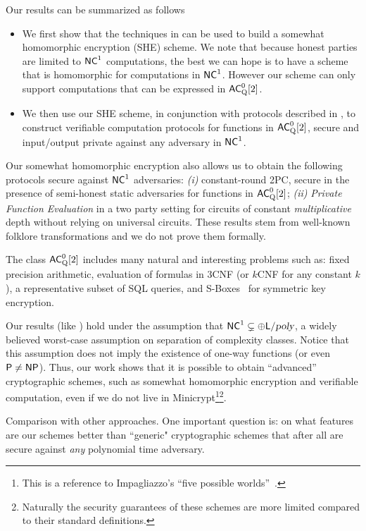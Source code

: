 Our results can be summarized as follows
\begin{itemize}
\item We first show that the techniques in \cite{fgcrypto} can be used to build a somewhat homomorphic encryption (SHE) scheme. 
We note that because honest parties are limited to 
${\mathsf{NC}}^1$ computations, the best we can hope is to have a scheme that is homomorphic for computations in ${\mathsf{NC}}^1$. However our scheme can only support computations that can be expressed in 
${\mathsf{AC}}^0_{\text{Q}}[2]$. 

\item We then use our SHE scheme, in conjunction with protocols described in \cite{ggp10,ckv10,aik10}, to construct verifiable 
computation protocols for functions in ${\mathsf{AC}}^0_{\text{Q}}[2]$, secure and input/output private against any adversary in ${\mathsf{NC}}^1$.

\end{itemize}
Our somewhat homomorphic encryption also allows us to obtain the following protocols secure against ${\mathsf{NC}}^1$ adversaries: \textit{(i)} constant-round 2PC, secure in the presence of semi-honest static adversaries for functions in ${\mathsf{AC}}^0_{\text{Q}}[2]$; \textit{(ii)} \textit{Private Function Evaluation} in a two party setting for circuits of constant \textit{multiplicative} depth without relying on universal circuits. These results stem from well-known folklore transformations and we do not prove them formally.

The class ${\mathsf{AC}}^0_{\text{Q}}[2]$ includes many natural and interesting problems such as: fixed precision arithmetic, evaluation of formulas in 3CNF (or $k$CNF for any constant $k$), a representative subset of SQL queries, and S-Boxes~\cite{sboxes} for symmetric key encryption. 

Our results (like \cite{fgcrypto}) hold under the assumption that ${\mathsf{NC}}^1 \subsetneq \oplus {\ensuremath{\mathsf{L}}} / {\textsl{poly}}$, a widely believed worst-case assumption on separation of complexity classes. Notice that this assumption does not imply the existence of one-way functions (or even ${\mathsf{P}} \not = {\mathsf{NP}}$). Thus, our work shows that it is possible to obtain ``advanced'' cryptographic schemes, such as somewhat homomorphic encryption and verifiable computation, even if we do not live in Minicrypt\footnote{This is a reference to Impagliazzo's ``five possible worlds''~\cite{impagliazzo1995personal}.}\footnote{Naturally the security guarantees of these schemes are more limited compared to their standard definitions.}.

\medskip
\noindent
{\sc Comparison with other approaches.}
One important question is: on what features are our schemes better than ``generic" cryptographic schemes that after all are secure against {\em any} polynomial time  adversary. 

